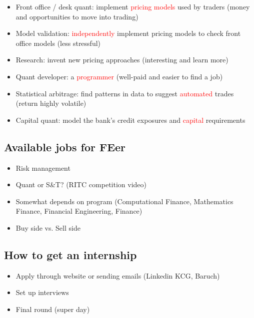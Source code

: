 \documentclass[
paper=128mm:96mm, %
fontsize=11pt, %
pagesize, %
parskip=half-, %
]{scrartcl} %
\theoremstyle{mythmstyle} %
\begin{document}
\clearpage


\begin{itemize}
\item Front office / desk quant: implement \textcolor{red}{pricing models} used by traders (money and opportunities to move into trading)
\item Model validation: \textcolor{red}{independently} implement pricing models to check front office models (less stressful)
\item Research: invent new pricing approaches (interesting and learn more)
\item Quant developer:  a \textcolor{red}{programmer} (well-paid and easier to find a job)
\item Statistical arbitrage: find patterns in data to suggest \textcolor{red}{automated} trades (return highly volatile)
\item Capital quant: model the bank's credit exposures and \textcolor{red}{capital} requirements
\end{itemize}

\clearpage



\subsection{Available jobs for FEer}

\begin{itemize}
\item Risk management
\item Quant or S\&T? (RITC competition video)
\item Somewhat depends on program (Computational Finance, Mathematics Finance, Financial Engineering, Finance)
\item Buy side vs. Sell side
\end{itemize}

\clearpage



\subsection{How to get an internship}

\begin{itemize}
\item Apply through website or sending emails (Linkedin KCG, Baruch)
\item Set up interviews
\item Final round (super day)
\end{itemize}
\end{document}
